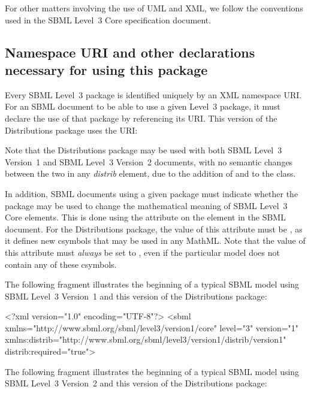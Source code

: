 \documentclass[draftspec]{sbmlpkgspec}
\newcommand{\sbmlthreecore}{SBML Level~3 Core\xspace}
\newcommand{\threeone}{SBML Level~3 Version~1\xspace}
\newcommand{\threetwo}{SBML Level~3 Version~2\xspace}
\newcommand{\DistribBase}{\defRef{DistribBase}{DistribBase-class}}
\newcommand{\distribshort}{\emph{distrib}\xspace}
\newcommand{\distrib}{Distributions\xspace}
\begin{document}
For other matters involving the use of UML and XML, we follow the
conventions used in the SBML Level~3 Core specification document.  


\subsection{Namespace URI and other declarations necessary for using this package}
\label{xml-namespace}

Every SBML Level~3 package is identified uniquely by an XML namespace URI.  For an SBML document to be able to use a given Level~3 package, it must declare the use of that package by referencing its URI.  This version of the \distrib package uses the URI:
\vspace*{-0.5ex}
\begin{center}
\end{center}

Note that the \distrib package may be used with both \threeone and \threetwo documents, with no semantic changes between the two in any \distribshort element, due to the addition of  and  to the \DistribBase class.

In addition, SBML documents using a given package must indicate whether the package may be used to change the mathematical meaning of \sbmlthreecore elements.  This is done using the attribute  on the  element in the SBML document.  For the \distrib package, the value of this attribute must be , as it defines new csymbols that may be used in any MathML.  Note that the value of this attribute must \emph{always} be set to , even if the particular model does not contain any of these csymbols.

The following fragment illustrates the beginning of a typical SBML model using \threeone and this version of the \distrib package:

\begin{example}
<?xml version="1.0" encoding="UTF-8"?>
<sbml xmlns="http://www.sbml.org/sbml/level3/version1/core" level="3" version="1"
      xmlns:distrib="http://www.sbml.org/sbml/level3/version1/distrib/version1"
      distrib:required="true">
\end{example}


The following fragment illustrates the beginning of a typical SBML model using \threetwo and this version of the \distrib package:
\end{document}
